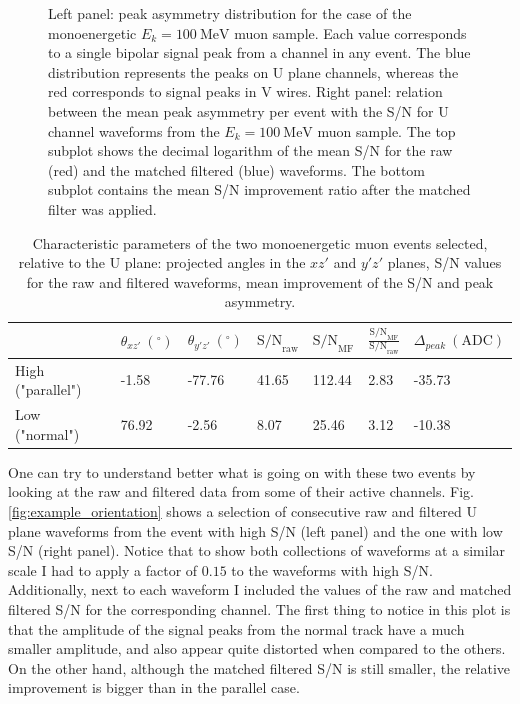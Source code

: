 \begin{figure}[t]
	\caption[Distribution of the peak asymmetry for the monoenergetic muon sample and dependence of the S/N change on the mean peak asymmetry of the event.]{Left panel: peak asymmetry distribution for the case of the monoenergetic $E_{k} = 100 \ \mathrm{MeV}$ muon sample. Each value corresponds to a single bipolar signal peak from a channel in any event. The blue distribution represents the peaks on U plane channels, whereas the red corresponds to signal peaks in V wires. Right panel: relation between the mean peak asymmetry per event with the S/N for U channel waveforms from the $E_{k} = 100 \ \mathrm{MeV}$ muon sample. The top subplot shows the decimal logarithm of the mean S/N for the raw (red) and the matched filtered (blue) waveforms. The bottom subplot contains the mean S/N improvement ratio after the matched filter was applied.}
	\label{fig:asymmetry}
\end{figure}

\begin{table}[h!]
	\centering
	\caption[Characteristic parameters of the two monoenergetic muon events selected for the peak asymmetry study.]{Characteristic parameters of the two monoenergetic muon events selected, relative to the U plane: projected angles in the $xz'$ and $y'z'$ planes, S/N values for the raw and filtered waveforms, mean improvement of the S/N and peak asymmetry.}
	\begin{tabular}{l|llllll}
		& $\theta_{xz'} \ (^{\circ})$ & $\theta_{y'z'} \ (^{\circ})$ & $\mathrm{S/N}_{\mathrm{raw}}$ & $\mathrm{S/N}_{\mathrm{MF}}$ & $\frac{\mathrm{S/N}_{\mathrm{MF}}}{\mathrm{S/N}_{\mathrm{raw}}}$ & $\Delta_{peak} \ (\mathrm{ADC})$ \\ \hline
		High ("parallel") & -1.58                     & -77.76                     & 41.65       & 112.44      & 2.83                          & -35.73                                                          \\
		Low ("normal")  & 76.92                     & -2.56                      & 8.07        & 25.46       & 3.12                          & -10.38                                                         
	\end{tabular}
	\label{tab:case}
\end{table}

One can try to understand better what is going on with these two events by looking at the raw and filtered data from some of their active channels. Fig. \ref{fig:example_orientation} shows a selection of consecutive raw and filtered U plane waveforms from the event with high S/N (left panel) and the one with low S/N (right panel). Notice that to show both collections of waveforms at a similar scale I had to apply a factor of $0.15$ to the waveforms with high S/N. Additionally, next to each waveform I included the values of the raw and matched filtered S/N for the corresponding channel. The first thing to notice in this plot is that the amplitude of the signal peaks from the normal track have a much smaller amplitude, and also appear quite distorted when compared to the others. On the other hand, although the matched filtered S/N is still smaller, the relative improvement is bigger than in the parallel case.

